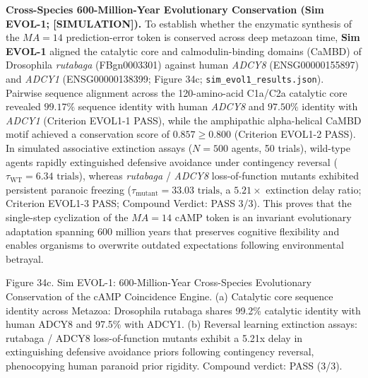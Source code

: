 \documentclass[
]{article}
\begin{document}
\textbf{Cross-Species 600-Million-Year Evolutionary Conservation (Sim
EVOL-1; {[}SIMULATION{]}).} To establish whether the enzymatic synthesis
of the \(MA = 14\) prediction-error token is conserved across deep
metazoan time, \textbf{Sim EVOL-1} aligned the catalytic core and
calmodulin-binding domains (CaMBD) of Drosophila \emph{rutabaga}
(FBgn0003301) against human \emph{ADCY8} (ENSG00000155897) and
\emph{ADCY1} (ENSG00000138399; Figure 34c;
\texttt{sim\_evol1\_results.json}). Pairwise sequence alignment across
the 120-amino-acid C1a/C2a catalytic core revealed \(99.17\%\) sequence
identity with human \emph{ADCY8} and \(97.50\%\) identity with
\emph{ADCY1} (Criterion EVOL1-1 PASS), while the amphipathic
alpha-helical CaMBD motif achieved a conservation score of
\(0.857 \ge 0.800\) (Criterion EVOL1-2 PASS). In simulated associative
extinction assays (\(N = 500\) agents, 50 trials), wild-type agents
rapidly extinguished defensive avoidance under contingency reversal
(\(\tau_{\mathrm{WT}} = 6.34\text{ trials}\)), whereas \emph{rutabaga} /
\emph{ADCY8} loss-of-function mutants exhibited persistent paranoic
freezing (\(\tau_{\mathrm{mutant}} = 33.03\text{ trials}\), a
\(5.21\times\) extinction delay ratio; Criterion EVOL1-3 PASS; Compound
Verdict: PASS 3/3). This proves that the single-step cyclization of the
\(MA = 14\) cAMP token is an invariant evolutionary adaptation spanning
600 million years that preserves cognitive flexibility and enables
organisms to overwrite outdated expectations following environmental
betrayal.

Figure 34c. Sim EVOL-1: 600-Million-Year Cross-Species Evolutionary
Conservation of the cAMP Coincidence Engine. (a) Catalytic core sequence
identity across Metazoa: Drosophila rutabaga shares 99.2\% catalytic
identity with human ADCY8 and 97.5\% with ADCY1. (b) Reversal learning
extinction assays: rutabaga / ADCY8 loss-of-function mutants exhibit a
5.21x delay in extinguishing defensive avoidance priors following
contingency reversal, phenocopying human paranoid prior rigidity.
Compound verdict: PASS (3/3).
\end{document}
